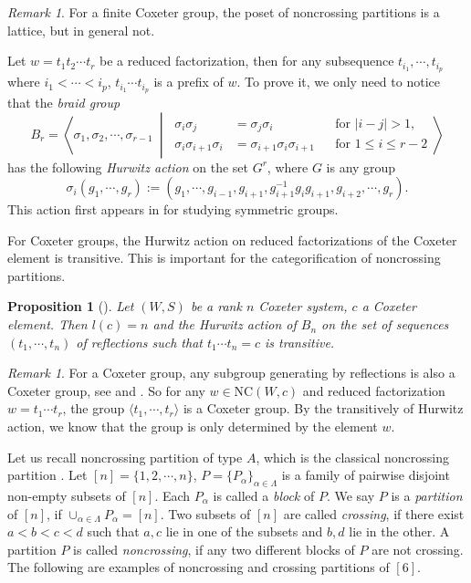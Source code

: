 \documentclass[a4paper, 11pt, reqno]{amsart}
\numberwithin{equation}{section}
\newtheorem{prop}[thm]{Proposition}
\theoremstyle{remark}
\newtheorem{rmk}[thm]{Remark}
\theoremstyle{definition}
\newcommand \grp[2]{\left \langle #1 \ \middle \vert \ #2 \right \rangle}
\begin{document}
\begin{rmk}
For a finite Coxeter group, the poset of noncrossing partitions is a lattice, but in general not.
\end{rmk}

Let $w=t_1 t_2 \cdots t_r$ be a reduced factorization, then for any subsequence $t_{i_1},\cdots,t_{i_p}$ where $i_1 < \cdots <i_p$, $t_{i_1} \cdots t_{i_p}$ is a prefix of $w$. To prove it, we only need to notice that the \emph{braid group} 
\[
   B_r=\grp{\sigma_1, \sigma_2, \cdots, \sigma_{r-1}}{
      \begin{aligned}
         \sigma_i \sigma_j &=\sigma_j \sigma_i &&\text{for } |i-j|>1, \\
         \sigma_i \sigma_{i+1} \sigma_i &= \sigma _{i+1} \sigma_i \sigma_{i+1} &&\text{for } 1 \leq i \leq r-2
      \end{aligned}
   }
\] 
has the following \emph{Hurwitz action} on the set $G^r$, where $G$ is any group
\[
    \sigma_i(g_1, \cdots, g_r):=(g_1, \cdots, g_{i-1},g_{i+1},g_{i+1}^{-1} g_i g_{i+1}, g_{i+2}, \cdots, g_r).
\]
This action first appears in \cite{hurwitz1901anzahl} for studying symmetric groups.

For Coxeter groups, the Hurwitz action on reduced factorizations of the Coxeter element is transitive. This is important for the categorification of noncrossing partitions.

\begin{prop} [{\cite[Theorem 1.4]{igusa2010exceptional}}]
   Let $(W,S)$ be a rank $n$ Coxeter system, $c$ a Coxeter element. Then $l(c)=n$ and the Hurwitz action of $B_n$ on the set of sequences $(t_1, \cdots, t_n)$ of reflections such that $t_1 \cdots t_n=c$ is transitive.
\end{prop}

\begin{rmk}
   For a Coxeter group, any subgroup generating by reflections is also a Coxeter group, see \cite[Theorem]{deodhar1989note} and \cite[Theorem 3.3]{dyer1990reflection}. So for any $w \in \mathrm{NC}(W,c)$ and reduced factorization $w=t_1 \cdots t_r$, the group $\langle t_1, \cdots, t_r \rangle$ is a Coxeter group. By the transitively of Hurwitz action, we know that the group is only determined by the element $w$.
\end{rmk}

Let us recall noncrossing partition of type $A$, which is the classical noncrossing partition \cite{kreweras1972partitions}. Let $[n]=\{1,2,\cdots,n\}$, $P=\{P_\alpha\}_{\alpha \in \Lambda}$ is a family of pairwise disjoint non-empty subsets of $[n]$. Each $P_{\alpha}$ is called a \emph{block} of $P$. We say $P$ is a \emph{partition} of $[n]$, if $\cup_{\alpha \in \Lambda} P_\alpha=[n]$. Two subsets of $[n]$ are called \emph{crossing}, if there exist $a<b<c<d$ such that $a,c$ lie in one of the subsets and $b,d$ lie in the other. %
A partition $P$ is called \emph{noncrossing}, if any two different blocks of $P$ are not crossing. The following are examples of noncrossing and crossing partitions of $[6]$.
\end{document}
